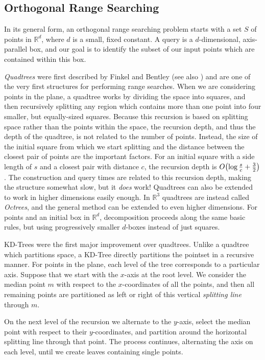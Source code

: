 \subsection*{Orthogonal Range Searching} 

In its general form, an orthogonal range searching problem starts with a set $S$ of points in $\mathbb{R}^d$, where $d$ is a small, fixed constant.
A query is a $d$-dimensional, axis-parallel box, and our goal is to identify the subset of our input points which are contained within this box.

\emph{Quadtrees} were first described by Finkel and Bentley\cite{Finkel74} (see also \cite{debergch14}) and are one of the very first structures for performing range searches.
When we are considering points in the plane, a quadtree works by dividing the space into squares, and then recursively splitting any region which contains more than one point into four smaller, but equally-sized squares.
Because this recursion is based on splitting space rather than the points within the space, the recursion depth, and thus the depth of the quadtree, is not related to the number of points. 
Instead, the size of the initial square from which we start splitting and the distance between the closest pair of points are the important factors.
For an initial square with a side length of $s$ and a closest pair with distance $c$, the recursion depth is $O\!\left(\log{\frac{s}{c}} + \frac{3}{2}\right)$.
The construction and query times are related to this recursion depth, making the structure somewhat slow, but it \emph{does} work!
Quadtrees can also be extended to work in higher dimensions easily enough. 
In $\mathbb{R}^3$ quadtrees are instead called \emph{Octrees}, and the general method can be extended to even higher dimensions. 
For points and an initial box in $\mathbb{R}^d$, decomposition proceeds along the same basic rules, but using progressively smaller $d$-boxes instead of just squares.


KD-Trees\cite{Bentley75} were the first major improvement over quadtrees.
Unlike a quadtree which partitions space, a KD-Tree directly partitions the pointset in a recursive manner.
For points in the plane, each level of the tree corresponds to a particular axis.
Suppose that we start with the $x$-axis at the root level.
We consider the median point $m$ with respect to the $x$-coordinates of all the points, and then all remaining points are partitioned as left or right of this vertical \emph{splitting line} through $m$.

On the next level of the recursion we alternate to the $y$-axis, select the median point with respect to their $y$-coordinates, and partition around the horizontal splitting line through that point.
The process continues, alternating the axis on each level, until we create leaves containing single points.

